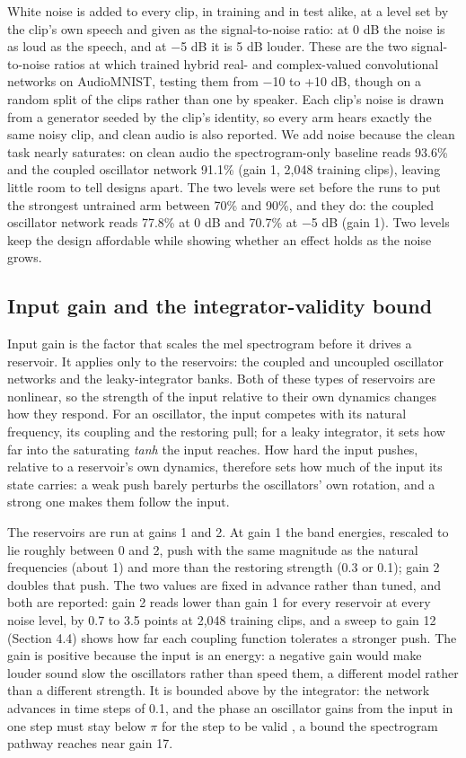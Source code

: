 \documentclass[10pt]{article}
\begin{document}
White noise is added to every clip, in training and in test alike, at a
level set by the clip's own speech and given as the signal-to-noise
ratio: at 0 dB the noise is as loud as the speech, and at
\ensuremath{-}5 dB it is 5 dB louder. These are the two signal-to-noise
ratios at which \citet{young2026} trained hybrid real- and
complex-valued convolutional networks on AudioMNIST, testing them from
\ensuremath{-}10 to +10 dB, though on a random split of the clips rather
than one by speaker. Each clip's noise is drawn from a generator seeded
by the clip's identity, so every arm hears exactly the same noisy clip,
and clean audio is also reported. We add noise because the clean task
nearly saturates: on clean audio the spectrogram-only baseline reads
93.6\% and the coupled oscillator network 91.1\% (gain 1, 2,048 training
clips), leaving little room to tell designs apart. The two levels were
set before the runs to put the strongest untrained arm between 70\% and
90\%, and they do: the coupled oscillator network reads 77.8\% at 0 dB
and 70.7\% at \ensuremath{-}5 dB (gain 1). Two levels keep the design
affordable while showing whether an effect holds as the noise grows.

\subsection{Input gain and the integrator-validity
bound}\label{input-gain-and-the-integrator-validity-bound}

Input gain is the factor that scales the mel spectrogram before it
drives a reservoir. It applies only to the reservoirs: the coupled and
uncoupled oscillator networks and the leaky-integrator banks. Both of
these types of reservoirs are nonlinear, so the strength of the input
relative to their own dynamics changes how they respond. For an
oscillator, the input competes with its natural frequency, its coupling
and the restoring pull; for a leaky integrator, it sets how far into the
saturating \emph{tanh} the input reaches. How hard the input pushes,
relative to a reservoir's own dynamics, therefore sets how much of the
input its state carries: a weak push barely perturbs the oscillators'
own rotation, and a strong one makes them follow the input.

The reservoirs are run at gains 1 and 2. At gain 1 the band energies,
rescaled to lie roughly between 0 and 2, push with the same magnitude as
the natural frequencies (about 1) and more than the restoring strength
(0.3 or 0.1); gain 2 doubles that push. The two values are fixed in
advance rather than tuned, and both are reported: gain 2 reads lower
than gain 1 for every reservoir at every noise level, by 0.7 to 3.5
points at 2,048 training clips, and a sweep to gain 12 (Section 4.4)
shows how far each coupling function tolerates a stronger push. The gain
is positive because the input is an energy: a negative gain would make
louder sound slow the oscillators rather than speed them, a different
model rather than a different strength. It is bounded above by the
integrator: the network advances in time steps of 0.1, and the phase an
oscillator gains from the input in one step must stay below
\ensuremath{\pi} for the step to be valid \citep{hairer1993}, a bound
the spectrogram pathway reaches near gain 17.
\end{document}
